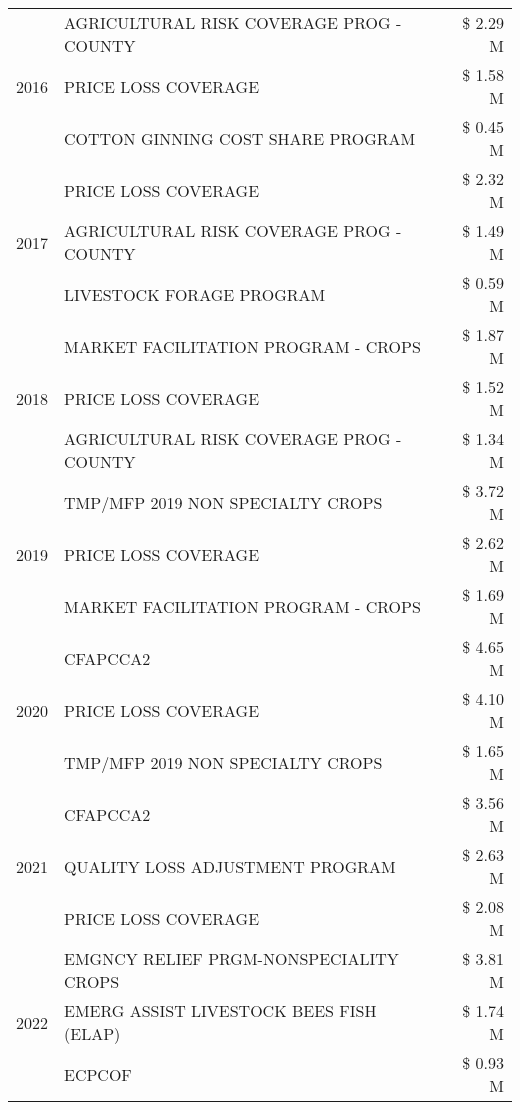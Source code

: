 \begin{tabular}{llr}
\cline{1-3}
\multirow[t]{3}{*}{2016} & AGRICULTURAL RISK COVERAGE PROG - COUNTY & \$ 2.29 M \\
 & PRICE LOSS COVERAGE & \$ 1.58 M \\
 & COTTON GINNING COST SHARE PROGRAM & \$ 0.45 M \\
\cline{1-3}
\multirow[t]{3}{*}{2017} & PRICE LOSS COVERAGE & \$ 2.32 M \\
 & AGRICULTURAL RISK COVERAGE PROG - COUNTY & \$ 1.49 M \\
 & LIVESTOCK FORAGE PROGRAM & \$ 0.59 M \\
\cline{1-3}
\multirow[t]{3}{*}{2018} & MARKET FACILITATION PROGRAM - CROPS & \$ 1.87 M \\
 & PRICE LOSS COVERAGE & \$ 1.52 M \\
 & AGRICULTURAL RISK COVERAGE PROG - COUNTY & \$ 1.34 M \\
\cline{1-3}
\multirow[t]{3}{*}{2019} & TMP/MFP 2019 NON SPECIALTY CROPS & \$ 3.72 M \\
 & PRICE LOSS COVERAGE & \$ 2.62 M \\
 & MARKET FACILITATION PROGRAM - CROPS & \$ 1.69 M \\
\cline{1-3}
\multirow[t]{3}{*}{2020} & CFAPCCA2 & \$ 4.65 M \\
 & PRICE LOSS COVERAGE & \$ 4.10 M \\
 & TMP/MFP 2019 NON SPECIALTY CROPS & \$ 1.65 M \\
\cline{1-3}
\multirow[t]{3}{*}{2021} & CFAPCCA2 & \$ 3.56 M \\
 & QUALITY LOSS ADJUSTMENT PROGRAM & \$ 2.63 M \\
 & PRICE LOSS COVERAGE & \$ 2.08 M \\
\cline{1-3}
\multirow[t]{3}{*}{2022} & EMGNCY RELIEF PRGM-NONSPECIALITY CROPS & \$ 3.81 M \\
 & EMERG ASSIST LIVESTOCK BEES FISH (ELAP) & \$ 1.74 M \\
 & ECPCOF & \$ 0.93 M \\
\cline{1-3}
\bottomrule
\end{tabular}
